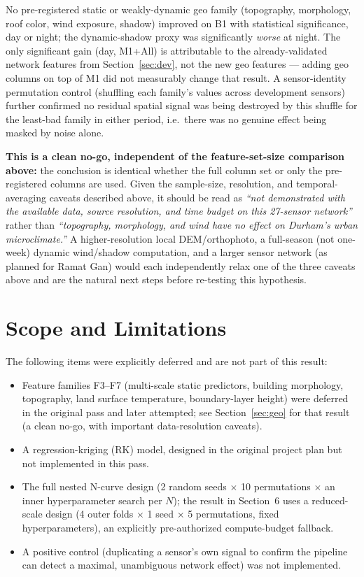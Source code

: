 \documentclass[11pt]{article}
\begin{document}
No pre-registered static or weakly-dynamic geo family (topography,
morphology, roof color, wind exposure, shadow) improved on B1 with
statistical significance, day or night; the dynamic-shadow proxy was
significantly \emph{worse} at night. The only significant gain (day,
M1+All) is attributable to the already-validated network features from
Section~\ref{sec:dev}, not the new geo features --- adding geo columns on
top of M1 did not measurably change that result. A sensor-identity
permutation control (shuffling each family's values across development
sensors) further confirmed no residual spatial signal was being destroyed
by this shuffle for the least-bad family in either period, i.e.\ there was
no genuine effect being masked by noise alone.

\textbf{This is a clean no-go, independent of the feature-set-size
comparison above:} the conclusion is identical whether the full column set
or only the pre-registered columns are used. Given the sample-size, resolution, and
temporal-averaging caveats described above, it should be read as
\emph{``not demonstrated with the available data, source resolution, and
time budget on this 27-sensor network''} rather than \emph{``topography,
morphology, and wind have no effect on Durham's urban microclimate.''} A
higher-resolution local DEM/orthophoto, a full-season (not one-week) dynamic
wind/shadow computation, and a larger sensor network (as planned for Ramat
Gan) would each independently relax one of the three caveats above and are
the natural next steps before re-testing this hypothesis.

\section{Scope and Limitations}
\label{sec:scope}

The following items were explicitly deferred and are not part of this
result:
\begin{itemize}
  \item Feature families F3--F7 (multi-scale static predictors, building
  morphology, topography, land surface temperature, boundary-layer height)
  were deferred in the original pass and later attempted; see
  Section~\ref{sec:geo} for that result (a clean no-go, with important
  data-resolution caveats).
  \item A regression-kriging (RK) model, designed in the original project
  plan but not implemented in this pass.
  \item The full nested N-curve design (2 random seeds $\times$ 10
  permutations $\times$ an inner hyperparameter search per $N$); the result
  in Section~6 uses a reduced-scale design (4 outer folds $\times$ 1 seed
  $\times$ 5 permutations, fixed hyperparameters), an explicitly
  pre-authorized compute-budget fallback.
  \item A positive control (duplicating a sensor's own signal to confirm
  the pipeline can detect a maximal, unambiguous network effect) was not
  implemented.
\end{itemize}
\end{document}

